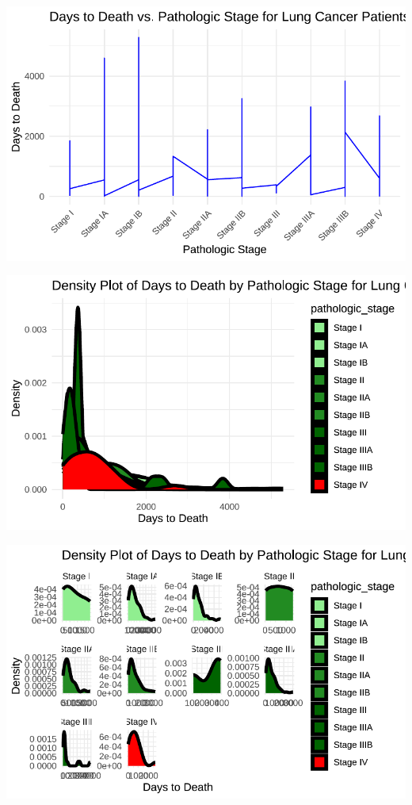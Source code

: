 \documentclass[
  letterpaper,
  DIV=11,
  numbers=noendperiod]{scrartcl}
\begin{document}
\includegraphics{paper_files/figure-pdf/unnamed-chunk-4-2.pdf}

\includegraphics{paper_files/figure-pdf/unnamed-chunk-4-3.pdf}

\includegraphics{paper_files/figure-pdf/unnamed-chunk-4-4.pdf}
\end{document}
